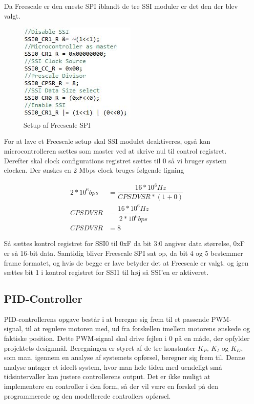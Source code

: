 Da Freescale er den eneste SPI iblandt de tre SSI moduler er det den der blev valgt.

		\begin{figure}[ht]
			\begin{center}
			\includegraphics[scale=0.8]{Billeder/Spi_Setup.jpg}
			\end{center}
			\label{fig:SPI_Setup}
			\caption{Setup af Freescale SPI}
		\end{figure}

For at lave et Freescale setup skal SSI modulet deaktiveres, også kan microcontrolleren sættes som master ved at skrive nul til control registret.
Derefter skal clock configurations registret sættes til 0 så vi bruger system clocken.
Der ønskes en 2 Mbps clock bruges følgende ligning

\begin{align*}
2*10^6 bps &= \dfrac{16*10^6 Hz}{CPSDVSR * (1 + 0)}\\
CPSDVSR &= \dfrac{16*10^6 Hz}{2*10^6 bps}\\
CPSDVSR &= 8
\end{align*}

Så sættes kontrol registret for SSI0 til 0xF da bit 3:0 angiver data størrelse, 0xF er så 16-bit data. Samtidig bliver Freescale SPI sat op, da bit 4 og 5 bestemmer frame formatet, og hvis de begge er lave betyder det at Freescale er valgt. 
og igen sættes bit 1 i kontrol registret for SSI1 til høj så SSI'en er aktiveret.

\subsection{PID-Controller}

PID-controllerens opgave består i at beregne sig frem til et passende PWM-signal, til at regulere motoren med, ud fra forskellen imellem motorens ønskede og faktiske position. Dette PWM-signal skal drive fejlen i 0 på en måde, der opfylder projektets designmål. Beregningen er styret af de tre konstanter $K_{P}$, $K_{I}$ og $K_{D}$, som man, igennem en analyse af systemets opførsel, beregner sig frem til. Denne analyse antager et ideelt system, hvor man hele tiden med uendeligt små tidsintervaller kan justere controllerens output. Det er ikke muligt at implementere en controller i den form, så der vil være en forskel på den programmerede og den modellerede controllers opførsel.



